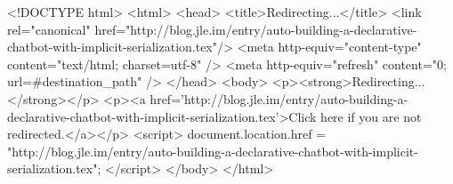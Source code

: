 <!DOCTYPE html>
<html>
<head>
<title>Redirecting...</title>
<link rel="canonical" href="http://blog.jle.im/entry/auto-building-a-declarative-chatbot-with-implicit-serialization.tex"/>
<meta http-equiv="content-type" content="text/html; charset=utf-8" />
<meta http-equiv="refresh" content="0; url=#{destination_path}" />
</head>
<body>
  <p><strong>Redirecting...</strong></p>
  <p><a href='http://blog.jle.im/entry/auto-building-a-declarative-chatbot-with-implicit-serialization.tex'>Click here if you are not redirected.</a></p>
  <script>
    document.location.href = "http://blog.jle.im/entry/auto-building-a-declarative-chatbot-with-implicit-serialization.tex";
  </script>
</body>
</html>
